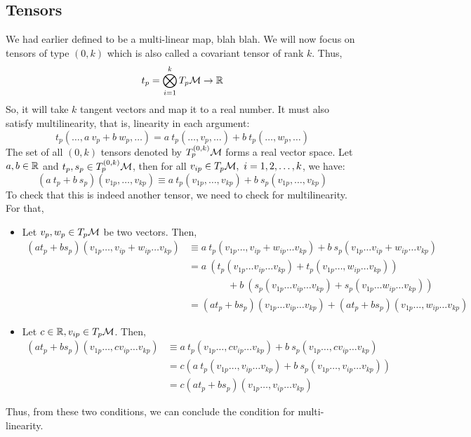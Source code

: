 \subsection{Tensors}
We had earlier defined to be a multi-linear map, blah blah. We will now focus on tensors of type $(0,k)$ which is also called a covariant tensor of rank $k$. Thus,
$$t_p = \bigotimes_{i=1}^k T_p\mathcal M\rightarrow \mathbb{R}$$
So, it will take $k$ tangent vectors and map it to a real number. It must also satisfy multilinearity, that is, linearity in each argument:
$$t_p(\ldots, a\ v_p + b\ w_p,\ldots ) = a \ t_p(\ldots,v_p,\ldots ) + b\ t_p(\ldots,w_p,\ldots ) $$
The set of all $(0,k)$ tensors denoted by $T_p^{(0,k)}\mathcal M$ forms a real vector space. Let $a,b\in \mathbb{R}$ and $t_p, s_p\in T_p^{(0,k)}\mathcal M$, then for all $v_{ip}\in T_p\mathcal M, \ i=1,2,\ldots,k$, we have:
$$(a\ t_p+b\ s_p)(v_{1p}, \ldots, v_{kp})\equiv a\ t_p(v_{1p}, \ldots, v_{kp})+b\ s_p(v_{1p}, \ldots, v_{kp})$$ 
To check that this is indeed another tensor, we need to check for multilinearity. For that,
\begin{itemize}
    \item Let $v_p, w_p\in T_p\mathcal M$ be two vectors. Then,
    \begin{align*}
        (a t_p+b s_p)(v_{1p} \ldots, v_{ip} + w_{ip}\ldots v_{kp})&\equiv a\ t_p(v_{1p}\ldots, v_{ip} + w_{ip} \ldots v_{kp})+b\ s_p(v_{1p} \ldots v_{ip} + w_{ip} \ldots v_{kp})\\
        &=a\ (t_p(v_{1p}\ldots v_{ip} \ldots v_{kp})+t_p(v_{1p}\ldots, w_{ip} \ldots v_{kp}))\\&\qquad \qquad+b\ (s_p(v_{1p} \ldots v_{ip} \ldots v_{kp})+s_p(v_{1p} \ldots w_{ip} \ldots v_{kp}))\\
        &=(a t_p + b s_p) (v_{1p}\ldots v_{ip} \ldots v_{kp}) + (a t_p + b s_p) (v_{1p}\ldots, w_{ip} \ldots v_{kp})
    \end{align*}
\item Let $c\in \mathbb{R}, v_{ip}\in T_p\mathcal M$. Then,
\begin{align*}
    (a t_p+b s_p)(v_{1p} \ldots, cv_{ip}\ldots v_{kp})&\equiv a\ t_p(v_{1p}\ldots, c v_{ip} \ldots v_{kp})+b\ s_p(v_{1p}\ldots, c v_{ip} \ldots v_{kp})\\ &= c(a\ t_p(v_{1p}\ldots,v_{ip} \ldots v_{kp})+b\ s_p(v_{1p}\ldots,v_{ip} \ldots v_{kp}))\\
    &=c (at_p+bs_p)(v_{1p}\ldots,v_{ip} \ldots v_{kp})
\end{align*}
\end{itemize}
Thus, from these two conditions, we can conclude the condition for multi-linearity. 
